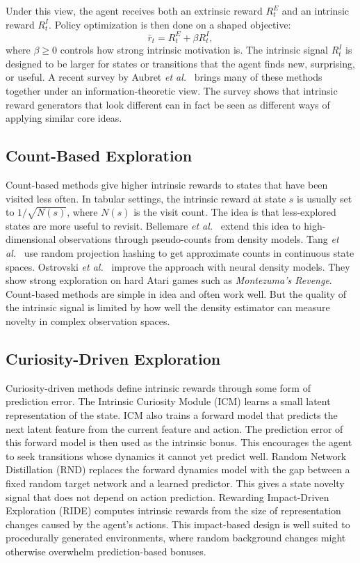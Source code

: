 Under this view, the agent receives both an extrinsic reward $R_t^E$ and an intrinsic reward $R_t^I$. Policy optimization is then done on a shaped objective:
\begin{equation}
\bar{r}_t = R_t^E + \beta R_t^I,
\label{eq:shaped_reward_lit}
\end{equation}
where $\beta \ge 0$ controls how strong intrinsic motivation is. The intrinsic signal $R_t^I$ is designed to be larger for states or transitions that the agent finds new, surprising, or useful. A recent survey by Aubret \textit{et al.}~\cite{aubret2023intrinsic} brings many of these methods together under an information-theoretic view. The survey shows that intrinsic reward generators that look different can in fact be seen as different ways of applying similar core ideas.

\subsection{Count-Based Exploration}
Count-based methods give higher intrinsic rewards to states that have been visited less often. In tabular settings, the intrinsic reward at state $s$ is usually set to $1/\sqrt{N(s)}$, where $N(s)$ is the visit count. The idea is that less-explored states are more useful to revisit. Bellemare \textit{et al.}~\cite{bellemare2016count} extend this idea to high-dimensional observations through pseudo-counts from density models. Tang \textit{et al.}~\cite{tang2017exploration} use random projection hashing to get approximate counts in continuous state spaces. Ostrovski \textit{et al.}~\cite{ostrovski2017count} improve the approach with neural density models. They show strong exploration on hard Atari games such as \textit{Montezuma's Revenge}. Count-based methods are simple in idea and often work well. But the quality of the intrinsic signal is limited by how well the density estimator can measure novelty in complex observation spaces.

\subsection{Curiosity-Driven Exploration}
Curiosity-driven methods define intrinsic rewards through some form of prediction error. The Intrinsic Curiosity Module (ICM) \cite{pathak2017curiosity} learns a small latent representation of the state. ICM also trains a forward model that predicts the next latent feature from the current feature and action. The prediction error of this forward model is then used as the intrinsic bonus. This encourages the agent to seek transitions whose dynamics it cannot yet predict well. Random Network Distillation (RND) \cite{burda2019rnd} replaces the forward dynamics model with the gap between a fixed random target network and a learned predictor. This gives a state novelty signal that does not depend on action prediction. Rewarding Impact-Driven Exploration (RIDE) \cite{raileanu2020ride} computes intrinsic rewards from the size of representation changes caused by the agent's actions. This impact-based design is well suited to procedurally generated environments, where random background changes might otherwise overwhelm prediction-based bonuses.

